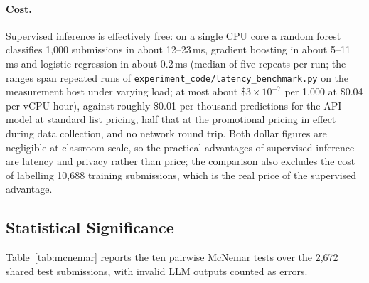 \documentclass[acmsmall]{acmart}
\begin{document}
\paragraph{Cost.} Supervised inference is effectively free: on a single CPU
core a random forest classifies 1,000 submissions in about 12--23\,ms, gradient
boosting in about 5--11\,ms and logistic regression in about 0.2\,ms (median of
five repeats per run; the ranges span repeated runs of
\texttt{experiment\_code/latency\_benchmark.py} on the measurement host under
varying load; at most about $\$3\times10^{-7}$ per 1,000 at
\$0.04 per vCPU-hour), against roughly \$0.01 per thousand predictions for the
API model at standard list pricing, half that at the promotional pricing in
effect during data collection, and no network round trip. Both dollar figures
are negligible at classroom scale, so the practical advantages of supervised
inference are latency and privacy rather than price; the comparison also
excludes the cost of labelling 10,688 training submissions, which is the real
price of the supervised advantage.

\subsection{Statistical Significance}
\label{sec:significance}

Table~\ref{tab:mcnemar} reports the ten pairwise McNemar tests over the
2{,}672 shared test submissions, with invalid LLM outputs counted as errors.

\begin{table}[htbp]
\centering
\caption{Pairwise McNemar tests on the shared test partition ($n=2{,}672$;
 Bonferroni threshold $\alpha'=0.005$).}
\label{tab:mcnemar}
\end{table}
\end{document}
